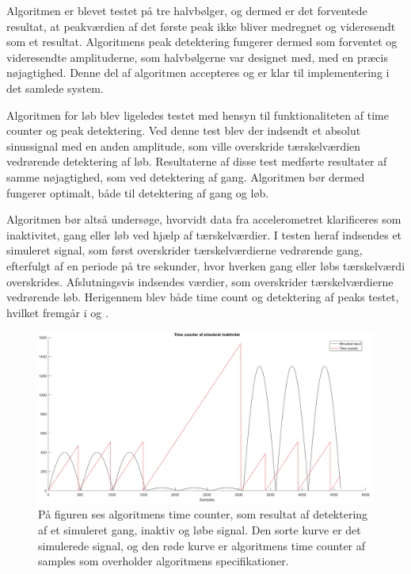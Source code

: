 Algoritmen er blevet testet på tre halvbølger, og dermed er det forventede resultat, at peakværdien af det første peak ikke bliver medregnet og videresendt som et resultat. Algoritmens peak detektering fungerer dermed som forventet og videresendte amplituderne, som halvbølgerne var designet med, med en præcis nøjagtighed. Denne del af algoritmen accepteres og er klar til implementering i det samlede system.

Algoritmen for løb blev ligeledes testet med hensyn til funktionaliteten af time counter og peak detektering. Ved denne test blev der indsendt et absolut sinussignal med en anden amplitude, som ville overskride tærskelværdien vedrørende detektering af løb. Resultaterne af disse test medførte resultater af samme nøjagtighed, som ved detektering af gang. Algoritmen bør dermed fungerer optimalt, både til detektering af gang og løb. 

Algoritmen bør altså undersøge, hvorvidt data fra accelerometret klarificeres som inaktivitet, gang eller løb ved hjælp af tærskelværdier. I testen heraf indsendes et simuleret signal, som først overskrider tærskelværdierne vedrørende gang, efterfulgt af en periode på tre sekunder, hvor hverken gang eller løbs tærskelværdi overskrides. Afslutningsvis indsendes værdier, som overskrider tærskelværdierne vedrørende løb. Herigennem blev både time count og detektering af peaks testet, hvilket fremgår i  og . 
\begin{figure}[H]
	\centering
	\includegraphics[scale=0.35]{figures/cDesign/test_timecount_inaktiv.png}
	\caption{På figuren ses algoritmens time counter, som resultat af detektering af et simuleret gang, inaktiv og løbe signal. Den sorte kurve er det simulerede signal, og den røde kurve er algoritmens time counter af samples som overholder algoritmens specifikationer.}
	\label{fig:test_inaktiv_time}
\end{figure}

